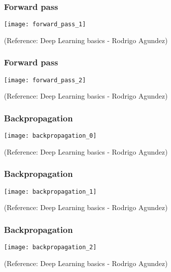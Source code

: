 \begin{frame}[fragile] \frametitle{Forward pass}

\begin{center}
\texttt{[image: forward\_pass\_1]}

\end{center}

\tiny{(Reference: Deep Learning basics - Rodrigo Agundez)}

\end{frame}

\begin{frame}[fragile] \frametitle{Forward pass}

\begin{center}
\texttt{[image: forward\_pass\_2]}

\end{center}

\tiny{(Reference: Deep Learning basics - Rodrigo Agundez)}

\end{frame}

\begin{frame}[fragile] \frametitle{Backpropagation}

\begin{center}
\texttt{[image: backpropagation\_0]}

\end{center}

\tiny{(Reference: Deep Learning basics - Rodrigo Agundez)}

\end{frame}

\begin{frame}[fragile] \frametitle{Backpropagation}

\begin{center}
\texttt{[image: backpropagation\_1]}

\end{center}

\tiny{(Reference: Deep Learning basics - Rodrigo Agundez)}

\end{frame}

\begin{frame}[fragile] \frametitle{Backpropagation}

\begin{center}
\texttt{[image: backpropagation\_2]}

\end{center}

\tiny{(Reference: Deep Learning basics - Rodrigo Agundez)}

\end{frame}


